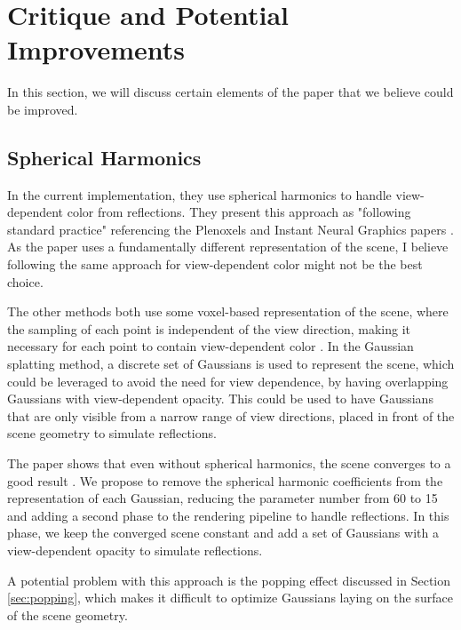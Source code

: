 \section{Critique and Potential Improvements}
In this section, we will discuss certain elements of the paper that we believe could be improved.

\subsection{Spherical Harmonics}
\label{sec:spherical_harmonics}
In the current implementation, they use spherical harmonics to handle view-dependent color from reflections.
They present this approach as "following standard practice" referencing the Plenoxels and Instant Neural Graphics papers \cite{yuPlenoxelsRadianceFields2021a}\cite{mullerInstantNeuralGraphics2022}.
As the paper uses a fundamentally different representation of the scene, I believe following the same approach for view-dependent color might not be the best choice.

The other methods both use some voxel-based representation of the scene,
where the sampling of each point is independent of the view direction,
making it necessary for each point to contain view-dependent color \cite{yuPlenoxelsRadianceFields2021a}\cite{mullerInstantNeuralGraphics2022}.
In the Gaussian splatting method, a discrete set of Gaussians is used to represent the scene, which could be leveraged to avoid the need for view dependence, by having overlapping Gaussians with view-dependent opacity.
This could be used to have Gaussians that are only visible from a narrow range of view directions, placed in front of the scene geometry to simulate reflections.

The paper shows that even without spherical harmonics, the scene converges to a good result \cite[Table 3]{kerbl3DGaussianSplatting2023}.
We propose to remove the spherical harmonic coefficients from the representation of each Gaussian, reducing the parameter number from 60 to 15 and adding a second phase to the rendering pipeline to handle reflections.
In this phase, we keep the converged scene constant and add a set of Gaussians with a view-dependent opacity to simulate reflections.

A potential problem with this approach is the popping effect discussed in Section \ref{sec:popping}, which makes it difficult to optimize Gaussians laying on the surface of the scene geometry.

